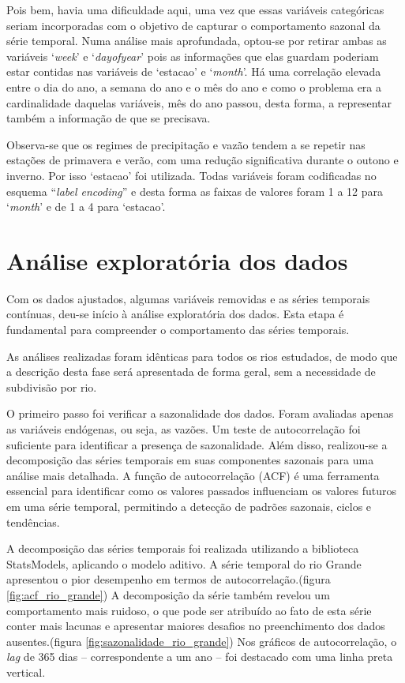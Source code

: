 Pois bem, havia uma dificuldade aqui, uma vez que essas variáveis categóricas seriam incorporadas com o objetivo de capturar o comportamento sazonal da série temporal. Numa análise mais aprofundada, optou-se por retirar ambas as variáveis `\textit{week}' e `\textit{dayofyear}' pois as informações que elas guardam poderiam estar contidas nas variáveis de `estacao' e `\textit{month}'. Há uma correlação elevada entre o dia do ano, a semana do ano e o mês do ano e como o problema era a cardinalidade daquelas variáveis, mês do ano passou, desta forma, a representar também a informação de que se precisava.

Observa-se que os regimes de precipitação e vazão tendem a se repetir nas estações de primavera e verão, com uma redução significativa durante o outono e inverno. Por isso `estacao' foi utilizada. Todas variáveis foram codificadas no esquema ``\textit{label encoding}'' e desta forma as faixas de valores foram 1 a 12 para `\textit{month}' e de 1 a 4 para `estacao'.

\section{Análise exploratória dos dados}

Com os dados ajustados, algumas variáveis removidas e as séries temporais contínuas, deu-se início à análise exploratória dos dados. Esta etapa é fundamental para compreender o comportamento das séries temporais.

As análises realizadas foram idênticas para todos os rios estudados, de modo que a descrição desta fase será apresentada de forma geral, sem a necessidade de subdivisão por rio.

O primeiro passo foi verificar a sazonalidade dos dados. Foram avaliadas apenas as variáveis endógenas, ou seja, as vazões. Um teste de autocorrelação foi suficiente para identificar a presença de sazonalidade. Além disso, realizou-se a decomposição das séries temporais em suas componentes sazonais para uma análise mais detalhada. A função de autocorrelação (ACF) é uma ferramenta essencial para identificar como os valores passados influenciam os valores futuros em uma série temporal, permitindo a detecção de padrões sazonais, ciclos e tendências.

A decomposição das séries temporais foi realizada utilizando a biblioteca StatsModels, aplicando o modelo aditivo.\cite{seabold2010statsmodels} A série temporal do rio Grande apresentou o pior desempenho em termos de autocorrelação.(figura \ref{fig:acf_rio_grande}) A decomposição da série também revelou um comportamento mais ruidoso, o que pode ser atribuído ao fato de esta série conter mais lacunas e apresentar maiores desafios no preenchimento dos dados ausentes.(figura \ref{fig:sazonalidade_rio_grande}) Nos gráficos de autocorrelação, o \textit{lag} de 365 dias – correspondente a um ano – foi destacado com uma linha preta vertical.


